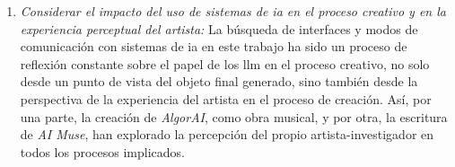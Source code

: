 \begin{enumerate}[label=\alph*)]
    \item \textit{Considerar el impacto del uso de sistemas de \gls{ia} en el proceso creativo y en la experiencia perceptual del artista:} La búsqueda de interfaces y modos de comunicación con sistemas de \gls{ia} en este trabajo ha sido un proceso de reflexión constante sobre el papel de los \gls{llm} en el proceso creativo, no solo desde un punto de vista del objeto final generado, sino también desde la perspectiva de la experiencia del artista en el proceso de creación. Así, por una parte, la creación de \emph{AlgorAI}, como obra musical, y por otra, la escritura de \emph{AI Muse}, han explorado la percepción del propio artista-investigador en todos los procesos implicados.
\end{enumerate}
